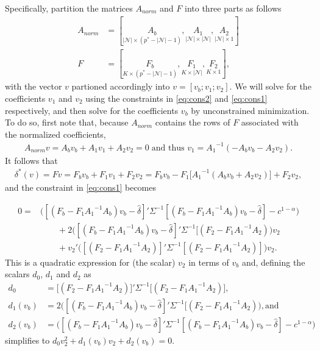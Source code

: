 \documentclass[12pt]{article}
\begin{document}
Specifically, partition the matrices $A_{norm}$ and $F$ into three parts as follows
\begin{align*}
A_{norm} &= [ \underset{|\mathcal{N}| \times (p^* - |\mathcal{N}| - 1)}{A_b}, \underset{|\mathcal{N}| \times |\mathcal{N}|}{A_1}, \underset{|\mathcal{N}| \times 1}{A_2}] \\
F &= [\underset{K \times  (p^* - |\mathcal{N}| -1) }{F_b},\underset{K \times |\mathcal{N}| }{F_1},\underset{K \times 1}{F_2}],
\end{align*}
with the vector $v$ partioned accordingly into $v=[v_b; v_1; v_2]$.
We will solve for the coefficients $v_1$ and $v_2$ using the constraints in \eqref{eq:cons2} and \eqref{eq:cons1} respectively, and then solve for the coefficients $v_b$ by unconstrained minimization.
To do so, first note that, because $A_{norm}$ contains the rows of $F$ associated with the normalized coefficients,
\begin{align}
A_{norm}v =  A_b v_b + A_1 v_1 + A_2 v_2 = 0 \;\text{and thus }v_1 = {A_1}^{-1}(- A_b v_b - A_2 v_2).\label{eq:def_v1}
\end{align}
It follows that
\begin{align*}
\delta^*(v)= Fv = F_b v_b + F_1 v_1 + F_2 v_2 = F_b v_b - F_1 \big[ {A_1}^{-1}( A_b v_b + A_2 v_2)\big] + F_2 v_2,
\end{align*}
and the constraint in \eqref{eq:cons1} becomes

\begin{align*}
0 = &\bigg([(F_b - F_1 {A_1}^{-1}A_b) v_b - \widehat{\delta}]' \Sigma ^ {-1} [(F_b - F_1 {A_1}^{-1}A_b) v_b - \widehat{\delta}] - c^{1 - \alpha} \bigg) \\
&\qquad + 2 \bigg([(F_b - F_1 {A_1}^{-1}A_b) v_b - \widehat{\delta}]' \Sigma ^ {-1} [(F_2 - F_1 {A_1}^{-1} A_2) \bigg) v_2 \nonumber \\
&\qquad +  v_2'\bigg([(F_2 - F_1 {A_1}^{-1} A_2)]'\Sigma ^ {-1} [(F_2 - F_1 {A_1}^{-1}A_2)] \bigg)v_2 .
\end{align*}
This is a quadratic expression for (the scalar) $v_2$ in terms of $v_b$ and, defining the scalars $d_0$, $d_1$ and $d_2$ as
\begin{align*}
d_0 &= \big[(F_2 - F_1 {A_1}^{-1} A_2)\big]'\Sigma ^ {-1} \big[(F_2 - F_1 {A_1}^{-1}A_2)\big], \\
d_1(v_b) &= 2 \bigg([(F_b - F_1 {A_1}^{-1}A_b) v_b - \widehat{\delta}]' \Sigma ^ {-1} [(F_2 - F_1 {A_1}^{-1} A_2) \bigg), \text{and} \\
d_2(v_b) &= \bigg([(F_b - F_1 {A_1}^{-1}A_b) v_b - \widehat{\delta}]' \Sigma ^ {-1} [(F_b - F_1 {A_1}^{-1}A_b) v_b - \widehat{\delta}] - c^{1 - \alpha} \bigg)
\end{align*}
simplifies to $d_0 v_2^2 +  d_1(v_b) v_2 + d_2 (v_b)=0$.
\end{document}

